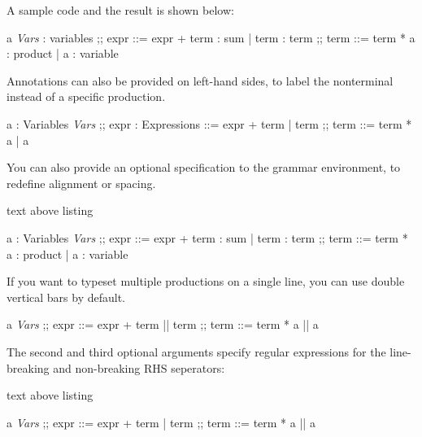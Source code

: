 \documentclass[a4paper]{article}
\begin{document}
A sample code and the result is shown below:
\begin{exampleside}
  \begin{bnfgrammar}
    a \in \textit{Vars} : variables
    ;;
    expr ::=
      expr + term : sum
    | term        : term
    ;;
    term ::=
      term * a : product
    | a        : variable
  \end{bnfgrammar}
\end{exampleside}

Annotations can also be provided on left-hand sides, to label the nonterminal instead of a specific production.
\begin{exampleside}
  \begin{bnfgrammar}
    a : Variables \in \textit{Vars}
    ;;
    expr : Expressions ::=
      expr + term
    | term
    ;;
    term ::=
      term * a
    | a
  \end{bnfgrammar}
\end{exampleside}

You can also provide an optional specification to the grammar environment, to redefine alignment or spacing.
\begin{tcblisting}{text above listing}
  \begin{bnfgrammar}
    a : Variables \in \textit{Vars}
    ;;
    expr ::=
      expr + term : sum
    | term        : term
    ;;
    term ::=
      term * a : product
    | a        : variable
  \end{bnfgrammar}
\end{tcblisting}

If you want to typeset multiple productions on a single line, you can use double vertical bars by default.
\begin{exampleside}
  \begin{bnfgrammar}
    a \in \textit{Vars}
    ;;
    expr ::= expr + term || term
    ;;
    term ::= term * a || a
  \end{bnfgrammar}
\end{exampleside}

The second and third optional arguments specify regular expressions for the line-breaking and non-breaking RHS seperators:
\begin{tcblisting}{text above listing}
  \begin{bnfgrammar}[llcll][\|\|][\|]
    a \in \textit{Vars}
    ;;
    expr ::= expr + term | term
    ;;
    term ::= term * a
    || a
  \end{bnfgrammar}
\end{tcblisting}
\end{document}
